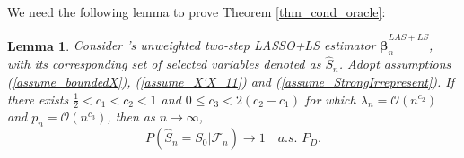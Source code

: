 \documentclass[ejs,authoryear,linksfromyear]{imsart}
\numberwithin{equation}{section}
\theoremstyle{plain}
\newtheorem{lem}{Lemma}[section]
\begin{document}
We need the following lemma to prove Theorem \ref{thm_cond_oracle}:

\begin{lem} \label{lem_asPD_LASLS}
	Consider \citet{Liu&Yu}'s unweighted two-step LASSO+LS estimator $\widehat{\bm{\beta}}_n^{LAS+LS}$, with its corresponding set of selected variables denoted as $\widehat{S}_n$. Adopt assumptions (\ref{assume_boundedX}), (\ref{assume_X'X_11}) and (\ref{assume_StrongIrrepresent}). If there exists $\frac{1}{2} < c_1 <  c_2 < 1$ and $0 \leq c_3 < 2(c_2 - c_1)$ for which $\lambda_n = \mathcal{O} \left( n^{c_2} \right)$ and $p_n = \mathcal{O} \left( n^{c_3} \right)$, then as $n \to \infty$,
	$$
	P\left(
		\widehat{S}_n = S_0	
		\Big| \mathcal{F}_n 
	\right)	
	\to 1
	\quad a.s. \,\, P_D. 
	$$ 
\end{lem}
\end{document}
